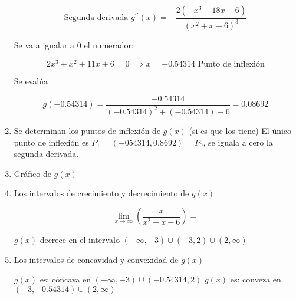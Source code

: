 \begin{example}
\begin{enumerate}
		      \begin{equation*}
			      \text{Segunda derivada } g^{\prime\prime}(x)= -\frac{2\left(-x^3-18x-6\right)}{\left(x^2+x-6\right)^3}
		      \end{equation*}

		      Se va a igualar a 0 el numerador:

		      \begin{equation*}
			      2x^3+x^2+11x+6=0 \implies x=-0.54314 \text{ Punto de inflexión}
		      \end{equation*}

		      Se evalúa

		      \begin{equation*}
			      g(-0.54314)= \frac{-0.54314}{(-0.54314)^2+(-0.54314)-6}=0.08692
		      \end{equation*}

		\item Se determinan los puntos de inflexión de $g(x)$ (si es que los tiene)
		      El único punto de inflexión es $P_{1}=(-054314,0.8692)=P_{0}$, se iguala a cero la segunda derivada.

		\item Gráfico de $g(x)$


		\item Los intervalos de crecimiento y decrecimiento de $g(x)$

		      \begin{equation*}
			      \lim _{x\to \infty }\left(\frac{x}{x^2+x-6}\right)=
		      \end{equation*}

		      $g(x)$ decrece en el intervalo $(-\infty, -3)\cup (-3,2) \cup (2,\infty)$

		\item Los intervalos de concavidad y convexidad de $g(x)$

		      $g(x)$ es: cóncava en $(-\infty, -3)\cup (-0.54314,2)$
		      $g(x)$ es: conveza en $(-3, -0.54314)\cup (2, \infty)$
	\end{enumerate}
\end{example}

